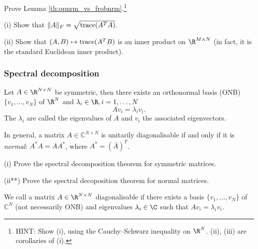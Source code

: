 \begin{exercise}
  Prove Lemma \ref{th:opnrm_vs_frobnrm}.\footnote{HINT: Show (i),
    using the Cauchy--Schwarz inequality on $\R^N$. (ii), (iii) are
    corollaries of (i).}
\end{exercise}

\begin{exercise}
  (i) Show that $\| A \|_F = \sqrt{{\rm trace}(A^T A)}$.

  (ii) Show that $(A, B) \mapsto {\rm trace}(A^T B)$ is an
  inner product on $\R^{M \times N}$ (in fact, it is the standard
  Euclidean inner product).
\end{exercise}


\subsubsection{Spectral decomposition}
%
Let $A \in \R^{N \times N}$ be symmetric, then there exists an
orthonormal basis (ONB) $\{v_1, \dots, v_N\}$ of $\R^N$ and
$\lambda_i \in \R, i = 1, \dots, N$
\begin{displaymath}
  A v_i = \lambda_i v_i.
\end{displaymath}
The $\lambda_i$ are called the eigenvalues of $A$ and $v_i$ the
associated eigenvectors.

\begin{remark}
  In general, a matrix $A \in \mathbb{C}^{N \times N}$ is unitarily
  diagonalisable if and only if it is {\em normal}: $A^* A = A A^*$,
  where $A^* = (\bar{A})^T$.
\end{remark}

\begin{exercise}
  (i) Prove the spectral decomposition theorem for symmetric matrices.

  (ii**) Prove the spectral decoposition theorem for normal matrices.
\end{exercise}


We call a matrix $A \in \R^{N \times N}$ diagonalisable if there
exists a basis $\{v_1, \dots, v_N\}$ of $\mathbb{C}^N$ (not
necessarily ONB) and eigenvalues $\lambda_i \in \C$ such that $A v_i =
\lambda_i v_i$.

